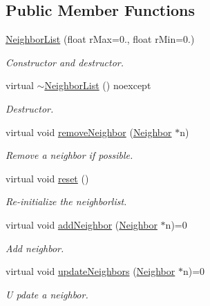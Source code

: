 \subsection*{Public Member Functions}
\begin{DoxyCompactItemize}
\item 
\hyperlink{classNeighborList_ae212e8bdc0ebd144b94ee7ea40a3abf4}{Neighbor\+List} (float r\+Max=0., float r\+Min=0.)
\begin{DoxyCompactList}\small\item\em Constructor and destructor. \end{DoxyCompactList}\item 
virtual \hyperlink{classNeighborList_aa6e2a28f42b4c501418094c24ffb709e}{$\sim$\+Neighbor\+List} () noexcept
\begin{DoxyCompactList}\small\item\em Destructor. \end{DoxyCompactList}\item 
virtual void \hyperlink{classNeighborList_aa64ee01bc18598fae6906ca6d5dcc7d6}{remove\+Neighbor} (\hyperlink{classNeighbor}{Neighbor} $\ast$n)
\begin{DoxyCompactList}\small\item\em Remove a neighbor if possible. \end{DoxyCompactList}\item 
virtual void \hyperlink{classNeighborList_a93a07ead9349edba7d763b483ec42847}{reset} ()
\begin{DoxyCompactList}\small\item\em Re-\/initialize the neighborlist. \end{DoxyCompactList}\item 
virtual void \hyperlink{classNeighborList_af38a1d2711a786e3c845858e867d912b}{add\+Neighbor} (\hyperlink{classNeighbor}{Neighbor} $\ast$n)=0
\begin{DoxyCompactList}\small\item\em Add neighbor. \end{DoxyCompactList}\item 
virtual void \hyperlink{classNeighborList_a843e9dcb6dd245e183252c1b5e538877}{update\+Neighbors} (\hyperlink{classNeighbor}{Neighbor} $\ast$n)=0
\begin{DoxyCompactList}\small\item\em U pdate a neighbor. \end{DoxyCompactList}\end{DoxyCompactItemize}
